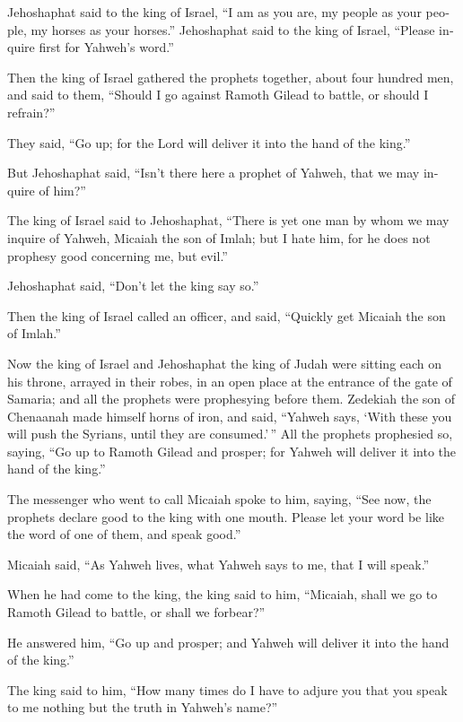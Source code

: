 \begin{paracol}{2}
\begin{otherlanguage}{english}
Jehoshaphat said to the king of Israel, ``I am as you are, my people as
your people, my horses as your horses.''  Jehoshaphat said
to the king of Israel, ``Please inquire first for Yahweh's word.''

 Then the king of Israel gathered the prophets together,
about four hundred men, and said to them, ``Should I go against Ramoth
Gilead to battle, or should I refrain?''

They said, ``Go up; for the Lord will deliver it into the hand of the
king.''

 But Jehoshaphat said, ``Isn't there here a prophet of
Yahweh, that we may inquire of him?''

 The king of Israel said to Jehoshaphat, ``There is yet
one man by whom we may inquire of Yahweh, Micaiah the son of Imlah; but
I hate him, for he does not prophesy good concerning me, but evil.''

Jehoshaphat said, ``Don't let the king say so.''

 Then the king of Israel called an officer, and said,
``Quickly get Micaiah the son of Imlah.''

 Now the king of Israel and Jehoshaphat the king of Judah
were sitting each on his throne, arrayed in their robes, in an open
place at the entrance of the gate of Samaria; and all the prophets were
prophesying before them.  Zedekiah the son of Chenaanah
made himself horns of iron, and said, ``Yahweh says, `With these you
will push the Syrians, until they are consumed.'\,''  All
the prophets prophesied so, saying, ``Go up to Ramoth Gilead and
prosper; for Yahweh will deliver it into the hand of the king.''

 The messenger who went to call Micaiah spoke to him,
saying, ``See now, the prophets declare good to the king with one mouth.
Please let your word be like the word of one of them, and speak good.''

 Micaiah said, ``As Yahweh lives, what Yahweh says to me,
that I will speak.''

 When he had come to the king, the king said to him,
``Micaiah, shall we go to Ramoth Gilead to battle, or shall we
forbear?''

He answered him, ``Go up and prosper; and Yahweh will deliver it into
the hand of the king.''

 The king said to him, ``How many times do I have to
adjure you that you speak to me nothing but the truth in Yahweh's
name?''


\end{otherlanguage}
\end{paracol}
